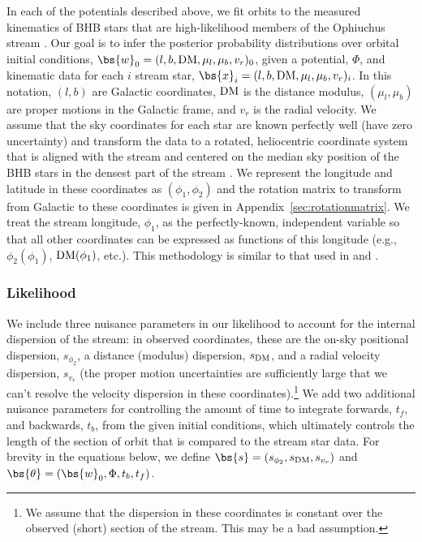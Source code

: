 \documentclass[letterpaper,12pt,preprint]{aastex}
\newcommand{\DM}{{\rm DM}}
\begin{document}
In each of the potentials described above, we fit orbits to the measured kinematics of BHB stars that are high-likelihood members of the Ophiuchus stream \citep{sesar15a, sesar15b}. Our goal is to infer the posterior probability distributions over orbital initial conditions, $\bs{w}_0=(l, b, \DM, \mu_l, \mu_b, v_r)_0$, given a potential, $\Phi$, and kinematic data for each $i$ stream star, $\bs{x}_i=(l, b, \DM, \mu_l, \mu_b, v_r)_i$. In this notation, $(l, b)$ are Galactic coordinates, $\DM$ is the distance modulus, $(\mu_l, \mu_b)$ are proper motions in the Galactic frame, and $v_r$ is the radial velocity. We assume that the sky coordinates for each star are known perfectly well (have zero uncertainty) and transform the data to a rotated, heliocentric coordinate system that is aligned with the stream and centered on the median sky position of the BHB stars in the densest part of the stream \cite[all BHB stars except the `fanned' stars: cand15, cand26, cand49, cand54 from][]{sesar15b}. We represent the longitude and latitude in these coordinates as $(\phi_1, \phi_2)$ and the rotation matrix to transform from Galactic to these coordinates is given in Appendix~\ref{sec:rotationmatrix}. We treat the stream longitude, $\phi_1$, as the perfectly-known, independent variable so that all other coordinates can be expressed as functions of this longitude (e.g., $\phi_2(\phi_1)$, ${\rm DM}(\phi_1)$, etc.). This methodology is similar to that used in \cite{koposov10} and \cite{sesar15a}.

\subsubsection{Likelihood}

We include three nuisance parameters in our likelihood to account for the internal dispersion of the stream: in observed coordinates, these are the on-sky positional dispersion, $s_{\phi_2}$, a distance (modulus) dispersion, $s_{\DM}$, and a radial velocity dispersion, $s_{v_r}$ (the proper motion uncertainties are sufficiently large that we can't resolve the velocity dispersion in these coordinates).\footnote{We assume that the dispersion in these coordinates is constant over the observed (short) section of the stream. This may be a bad assumption.} We add two additional nuisance parameters for controlling the amount of time to integrate forwards, $t_f$, and backwards, $t_b$, from the given initial conditions, which ultimately controls the length of the section of orbit that is compared to the stream star data. For brevity in the equations below, we define $\bs{s} = (s_{\phi_2}, s_{\DM}, s_{v_r})$ and $\bs{\theta} = (\bs{w}_0, \Phi, t_b, t_f)$.
\end{document}
